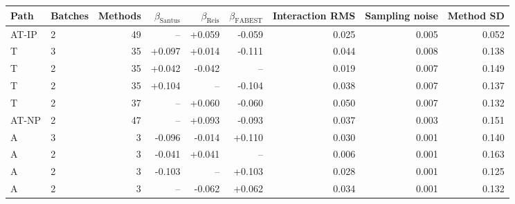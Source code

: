\begin{tabular}{llrrrrrrr}
\hline
Path & Batches & Methods & $\beta_{\mathrm{Santus}}$ & $\beta_{\mathrm{Reis}}$ & $\beta_{\mathrm{FABEST}}$ & Interaction RMS & Sampling noise & Method SD \\
\hline
AT-IP & 2 & 49 & -- & +0.059 & -0.059 & 0.025 & 0.005 & 0.052 \\
T & 3 & 35 & +0.097 & +0.014 & -0.111 & 0.044 & 0.008 & 0.138 \\
T & 2 & 35 & +0.042 & -0.042 & -- & 0.019 & 0.007 & 0.149 \\
T & 2 & 35 & +0.104 & -- & -0.104 & 0.038 & 0.007 & 0.137 \\
T & 2 & 37 & -- & +0.060 & -0.060 & 0.050 & 0.007 & 0.132 \\
AT-NP & 2 & 47 & -- & +0.093 & -0.093 & 0.037 & 0.003 & 0.151 \\
A & 3 & 3 & -0.096 & -0.014 & +0.110 & 0.030 & 0.001 & 0.140 \\
A & 2 & 3 & -0.041 & +0.041 & -- & 0.006 & 0.001 & 0.163 \\
A & 2 & 3 & -0.103 & -- & +0.103 & 0.028 & 0.001 & 0.125 \\
A & 2 & 3 & -- & -0.062 & +0.062 & 0.034 & 0.001 & 0.132 \\
\hline
\end{tabular}
